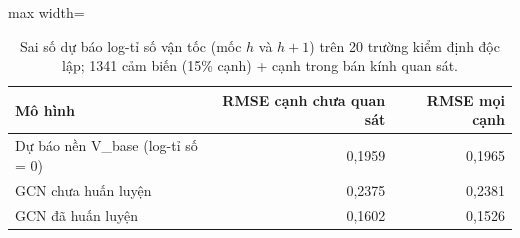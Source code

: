 \begin{table}[!htbp]
\centering
\small
\caption{Sai số dự báo log-tỉ số vận tốc (mốc $h$ và $h+1$) trên 20 trường kiểm định độc lập; 1341 cảm biến (15\% cạnh) + cạnh trong bán kính quan sát.}
\label{tab:tab_forecast}
\begin{adjustbox}{max width=\linewidth}
\begin{tabular}{lrr}
\toprule
Mô hình & RMSE cạnh chưa quan sát & RMSE mọi cạnh \\
\midrule
Dự báo nền V\_base (log-tỉ số = 0) & 0{,}1959 & 0{,}1965 \\
GCN chưa huấn luyện & 0{,}2375 & 0{,}2381 \\
GCN đã huấn luyện & 0{,}1602 & 0{,}1526 \\
\bottomrule
\end{tabular}
\end{adjustbox}
\end{table}
